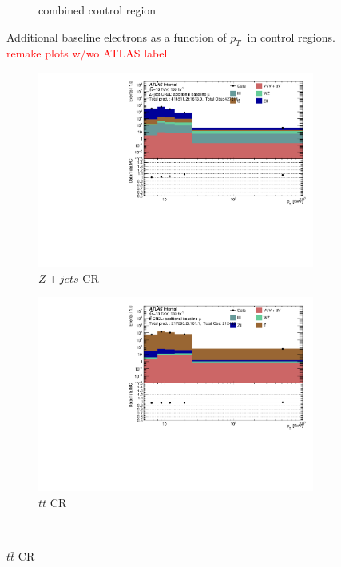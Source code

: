 \begin{figure}[htb]
\begin{subfigure}{.48\textwidth}
        \caption{combined control region}
    \end{subfigure}
        \caption{ Additional baseline electrons as a function of $p_{T}~$ in control regions. \textcolor{red}{remake plots w/wo ATLAS label} \label{fig:ControlRegionsAdditionalBaselineElectronpT}}
\end{figure}

\begin{figure}[htb]
    \begin{subfigure}{.48\textwidth}
        \centering
        \includegraphics[width=.9\linewidth]{figures/Analysis/Background/Overlay_pt_Baseline_muons_ZplusX.pdf}
        \caption{$Z+jets$ CR}
    \end{subfigure}
    \begin{subfigure}{.48\textwidth}
        \centering
        \includegraphics[width=.9\linewidth]{figures/Analysis/Background/Overlay_pt_Baseline_muons_ttbar.pdf}
        \caption{$t\bar{t}$ CR}
    \end{subfigure} \\

\end{figure}
